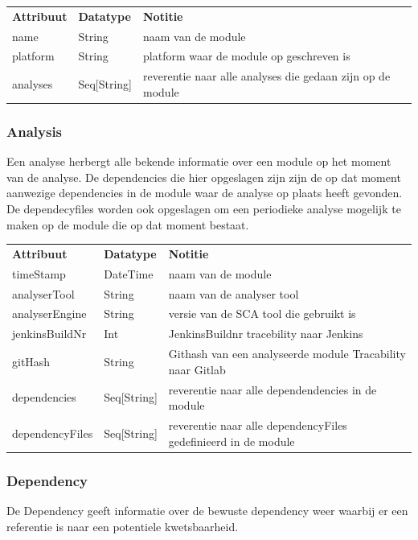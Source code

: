 \begin{tabular}{lll}
    \textbf{Attribuut} & \textbf{Datatype} & \textbf{Notitie}\\
    name  & String & naam van de module\\
    platform  & String & platform waar de module op geschreven is \\
    analyses  & Seq[String] & reverentie naar alle analyses die gedaan zijn op de module\\
\end{tabular}

\subsubsection{Analysis}\label{subsubsec:analysis}
Een analyse herbergt alle bekende informatie over een module op het moment van de analyse. De dependencies die hier opgeslagen zijn zijn de op dat moment aanwezige dependencies in de module waar de analyse op plaats heeft gevonden. De dependecyfiles worden ook opgeslagen om een periodieke analyse mogelijk te maken op de module die op dat moment bestaat.

\begin{tabular}{lll}
    \textbf{Attribuut} & \textbf{Datatype} & \textbf{Notitie}\\
    timeStamp & DateTime & naam van de module\\
    analyserTool & String & naam van de analyser tool\\
    analyserEngine & String & versie van de SCA tool die gebruikt is\\
    jenkinsBuildNr & Int & JenkinsBuildnr tracebility naar Jenkins\\
    gitHash & String & Githash van een analyseerde module Tracability naar Gitlab\\
    dependencies & Seq[String] & reverentie naar alle dependendencies in de module\\
    dependencyFiles & Seq[String] & reverentie naar alle dependencyFiles gedefinieerd in de module\\
\end{tabular}


\subsubsection{Dependency}\label{subsubsec:dependency}
De Dependency geeft informatie over de bewuste dependency weer waarbij er een referentie is naar een potentiele kwetsbaarheid.

